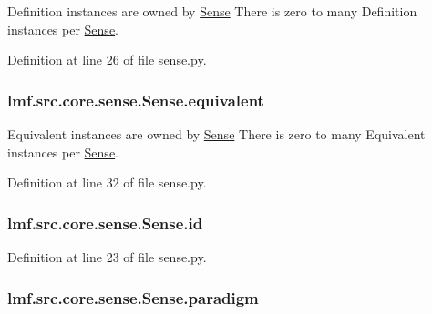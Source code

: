 Definition instances are owned by \hyperlink{classlmf_1_1src_1_1core_1_1sense_1_1_sense}{Sense} There is zero to many Definition instances per \hyperlink{classlmf_1_1src_1_1core_1_1sense_1_1_sense}{Sense}. 



Definition at line 26 of file sense.\+py.

\hypertarget{classlmf_1_1src_1_1core_1_1sense_1_1_sense_a94d3b05f734fbe8898902ae948d30ce5}{
\subsubsection[{equivalent}]{\setlength{\rightskip}{0pt plus 5cm}lmf.\+src.\+core.\+sense.\+Sense.\+equivalent}}\label{classlmf_1_1src_1_1core_1_1sense_1_1_sense_a94d3b05f734fbe8898902ae948d30ce5}


Equivalent instances are owned by \hyperlink{classlmf_1_1src_1_1core_1_1sense_1_1_sense}{Sense} There is zero to many Equivalent instances per \hyperlink{classlmf_1_1src_1_1core_1_1sense_1_1_sense}{Sense}. 



Definition at line 32 of file sense.\+py.

\hypertarget{classlmf_1_1src_1_1core_1_1sense_1_1_sense_ae0febecc9ab2951c5c6bb82f675187bc}{
\subsubsection[{id}]{\setlength{\rightskip}{0pt plus 5cm}lmf.\+src.\+core.\+sense.\+Sense.\+id}}\label{classlmf_1_1src_1_1core_1_1sense_1_1_sense_ae0febecc9ab2951c5c6bb82f675187bc}


Definition at line 23 of file sense.\+py.

\hypertarget{classlmf_1_1src_1_1core_1_1sense_1_1_sense_a3f36a95173e4d4e7244e407a725dd3a9}{
\subsubsection[{paradigm}]{\setlength{\rightskip}{0pt plus 5cm}lmf.\+src.\+core.\+sense.\+Sense.\+paradigm}}\label{classlmf_1_1src_1_1core_1_1sense_1_1_sense_a3f36a95173e4d4e7244e407a725dd3a9}


